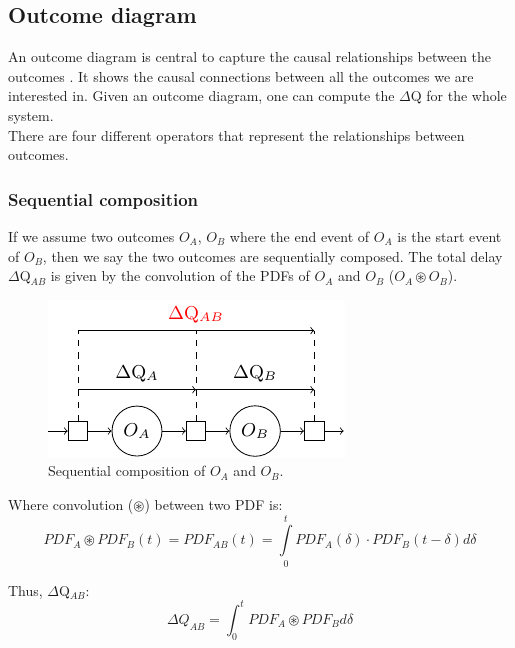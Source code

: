     \subsection{Outcome diagram}
        An outcome diagram is central to capture the causal relationships between the outcomes \cite{myo}. It shows the causal connections between all the outcomes we are interested in. Given an outcome diagram, one can compute the $\Delta$Q for the whole system. \\
        There are four different operators that represent the relationships between outcomes. \cite{dq-tut}
    \subsubsection{Sequential composition}
        If we assume two outcomes $O_A$, $O_B$ where the end event of $O_A$ is the start event of $O_B$, then we say the two outcomes are sequentially composed. The total delay $\Delta$Q$_{AB}$ is given by the convolution of the PDFs of $O_A$ and $O_B$ ($O_A \circledast O_B$).
        
        \begin{figure}[H]
            \begin{center}
                \includegraphics[scale=1]{tikz/seq_comp.pdf}
            \end{center}
            \caption{Sequential composition of $O_A$ and $O_B$.}
        \end{figure}
        Where convolution ($\circledast$) between two PDF is:
        \begin{equation}
            PDF_A \circledast PDF_B (t) = PDF_{AB}(t) =\int\limits_0^t PDF_A(\delta) \cdot PDF_B(t-\delta)d\delta 
            \label{eq:conv_1}
        \end{equation}

        Thus, $\Delta$Q$_{AB}$:
        \begin{equation}
            \Delta Q_{AB} = \int_0^t PDF_{A} \circledast PDF_{B} d\delta
            \label{eq:convolution_pdf}
        \end{equation}

